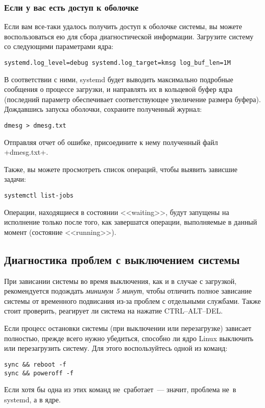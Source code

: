 \documentclass[10pt,oneside,a4paper]{article}
\begin{document}
\subsubsection{Если у вас есть доступ к оболочке}

Если вам все-таки удалось получить доступ к оболочке системы, вы можете
воспользоваться ею для сбора диагностической информации. Загрузите систему со
следующими параметрами ядра:
\begin{Verbatim}
systemd.log_level=debug systemd.log_target=kmsg log_buf_len=1M
\end{Verbatim}
В соответствии с ними, systemd будет выводить максимально подробные сообщения о
процессе загрузки, и направлять их в кольцевой буфер ядра (последний параметр
обеспечивает соответствующее увеличение размера буфера). Дождавшись запуска
оболочки, сохраните полученный журнал:
\begin{Verbatim}
dmesg > dmesg.txt
\end{Verbatim}
Отправляя отчет об ошибке, присоедините к нему полученный файл +dmesg.txt+.

Также, вы можете просмотреть список операций, чтобы выявить зависшие задачи:
\begin{Verbatim}
systemctl list-jobs
\end{Verbatim}
Операции, находящиеся в состоянии <<waiting>>, будут запущены на исполнение
только после того, как завершатся операции, выполняемые в данный момент
(состояние <<running>>).

\subsection{Диагностика проблем с выключением системы}

При зависании системы во время выключения, как и в случае с загрузкой,
рекомендуется подождать \emph{минимум 5 минут}, чтобы отличить полное зависание
системы от временного подвисания из-за проблем с отдельными службами. Также
стоит проверить, реагирует ли система на нажатие CTRL--ALT--DEL.

Если процесс остановки системы (при выключении или перезагрузке) зависает
полностью, прежде всего нужно убедиться, способно ли ядро Linux выключить или
перезагрузить систему. Для этого воспользуйтесь одной из команд:
\begin{Verbatim}
sync && reboot -f
sync && poweroff -f
\end{Verbatim}

Если хотя бы одна из этих команд не~сработает~--- значит, проблема не~в systemd,
а в ядре.
\end{document}
